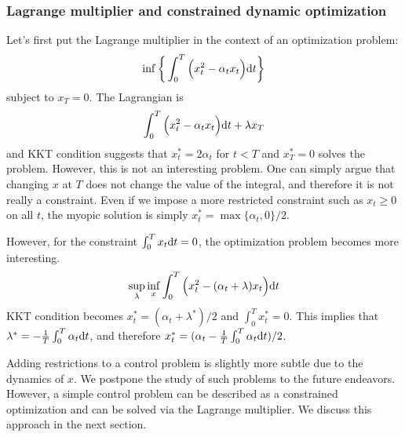 \documentclass[11pt]{book}
\newcommand{\dt}{\text{\normalfont d}t}
\begin{document}
\subsubsection{Lagrange multiplier and constrained dynamic optimization}
Let's first put the Lagrange multiplier in the context of an optimization problem:
    \begin{equation}
        \inf\bigg\{\int_0^T\Big(x_t^2 - \alpha_t x_t\Big) {{\dt}}\bigg\}
    \end{equation}
subject to $x_T=0$. The Lagrangian is
\begin{equation}
    \int_0^T\Big(x_t^2 - \alpha_t x_t\Big) {{\dt}} + \lambda x_T
\end{equation}
and KKT condition suggests that $x^*_t=2\alpha_t$ for $t<T$ and $x^*_T=0$ solves the problem. However, this is not an interesting problem. One can simply argue that changing $x$ at $T$ does not change the value of the integral, and therefore it is not really a constraint. Even if we impose a more restricted constraint such as $x_t\ge0$ on all $t$, the myopic solution is simply $x^*_t=\max\{\alpha_t,0\}/2$.

However, for the constraint $\int_0^T x_t{{\dt}} = 0$, the optimization problem becomes more interesting.
\begin{equation}
        \sup_{\lambda}\inf_{x}\int_0^T\Big(x_t^2 - (\alpha_t  + \lambda )x_t\Big) {{\dt}} 
\end{equation}
KKT condition becomes $x^*_t =   (\alpha_t + \lambda^* )/2$ and $\int_0^Tx^*_t=0$. This implies that $\lambda^* = -\frac{1}{T}\int_0^T\alpha_t{{\dt}}$, and therefore $x^*_t =   (\alpha_t - \frac{1}{T}\int_0^T\alpha_t{{\dt}} )/2$. 

Adding restrictions to a control problem is slightly more subtle due to the dynamics of $x$. We postpone the study of such problems to the future endeavors. However, a simple control problem can be described as a constrained optimization and can be solved via the Lagrange multiplier. We discuss this approach in the next section.
\end{document}
